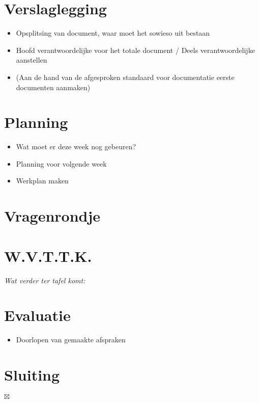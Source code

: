 \documentclass[]{article}
\begin{document}
\section{Verslaglegging}

  \begin{itemize}
    \item Opsplitsing van document, waar moet het sowieso uit bestaan
    \item Hoofd verantwoordelijke voor het totale document / Deels verantwoordelijke aanstellen
    \item (Aan de hand van de afgesproken standaard voor documentatie eerste documenten aanmaken)
  \end{itemize}

\section{Planning}
  \begin{itemize}
    \item Wat moet er deze week nog gebeuren?
    \item Planning voor volgende week
    \item Werkplan maken
  \end{itemize}

  \section{Vragenrondje}\label{sec:vraagrondje} %


  \section{W.V.T.T.K.}\label{sec:w_v_t_t_k_} %
  \emph{Wat verder ter tafel komt:}

\section{Evaluatie}
  \begin{itemize}
    \item Doorlopen van gemaakte afspraken
  \end{itemize}

\section{Sluiting}

$\boxtimes$
\end{document}

